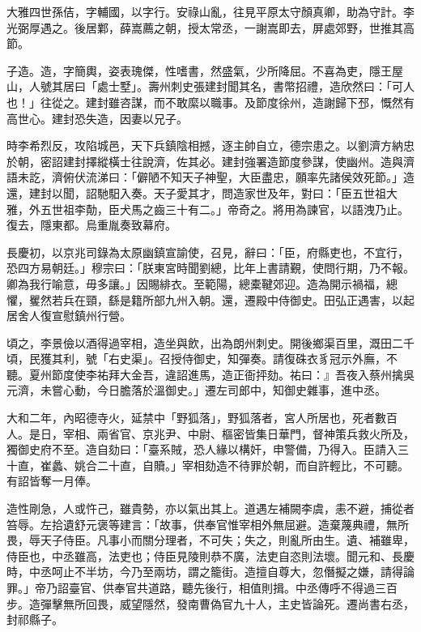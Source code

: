 \begin{pinyinscope}
 大雅四世孫佶，字輔國，以字行。安祿山亂，往見平原太守顏真卿，助為守計。李光弼厚遇之。後居鄴，薛嵩薦之朝，授太常丞，一謝嵩即去，屏處郊野，世推其高節。



 子造。造，字簡輿，姿表瑰傑，性嗜書，然盛氣，少所降屈。不喜為吏，隱王屋山，人號其居曰「處士墅」。壽州刺史張建封聞其名，書幣招禮，造欣然曰：「可人也！」往從之。建封雖咨謀，而不敢縻以職事。及節度徐州，造謝歸下邳，慨然有高世心。建封恐失造，因妻以兄子。



 時李希烈反，攻陷城邑，天下兵鎮陰相撼，逐主帥自立，德宗患之。以劉濟方納忠於朝，密詔建封擇縱橫士往說濟，佐其必。建封強署造節度參謀，使幽州。造與濟語未訖，濟俯伏流涕曰：「僻陋不知天子神聖，大臣盡忠，願率先諸侯效死節。」造還，建封以聞，詔馳馹入奏。天子愛其才，問造家世及年，對曰：「臣五世祖大雅，外五世祖李勣，臣犬馬之齒三十有二。」帝奇之。將用為諫官，以語洩乃止。復去，隱東都。烏重胤奏致幕府。



 長慶初，以京兆司錄為太原幽鎮宣諭使，召見，辭曰：「臣，府縣吏也，不宜行，恐四方易朝廷。」穆宗曰：「朕東宮時聞劉總，比年上書請覲，使問行期，乃不報。卿為我行喻意，毋多讓。」因賜緋衣。至範陽，總橐鞬郊迎。造為開示禍福，總懼，矍然若兵在頸，繇是籍所部九州入朝。還，遷殿中侍御史。田弘正遇害，以起居舍人復宣慰鎮州行營。



 頃之，李景儉以酒得過宰相，造坐與飲，出為朗州刺史。開後鄉渠百里，溉田二千頃，民獲其利，號「右史渠」。召授侍御史，知彈奏。請復硃衣豸冠示外廡，不聽。夏州節度使李祐拜大金吾，違詔進馬，造正衙抨劾。祐曰：』吾夜入蔡州擒吳元濟，未嘗心動，今日膽落於溫御史。」遷左司郎中，知御史雜事，進中丞。



 大和二年，內昭德寺火，延禁中「野狐落」，野狐落者，宮人所居也，死者數百人。是日，宰相、兩省官、京兆尹、中尉、樞密皆集日華門，督神策兵救火所及，獨御史府不至。造自劾曰：「臺系賊，恐人緣以構奸，申警備，乃得入。臣請入三十直，崔蠡、姚合二十直，自贖。」宰相劾造不待罪於朝，而自許輕比，不可聽。有詔皆奪一月俸。



 造性剛急，人或忤己，雖貴勢，亦以氣出其上。道遇左補闕李虞，恚不避，捕從者笞辱。左拾遺舒元褒等建言：「故事，供奉官惟宰相外無屈避。造棄蔑典禮，無所畏，辱天子侍臣。凡事小而關分理者，不可失；失之，則亂所由生。遺、補雖卑，侍臣也，中丞雖高，法吏也；侍臣見陵則恭不廣，法吏自恣則法壞。聞元和、長慶時，中丞呵止不半坊，今乃至兩坊，謂之籠街。造擅自尊大，忽僭擬之嫌，請得論罪。」帝乃詔臺官、供奉官共道路，聽先後行，相值則揖。中丞傳呼不得過三百步。造彈擊無所回畏，威望隱然，發南曹偽官九十人，主史皆論死。遷尚書右丞，封祁縣子。




\end{pinyinscope}
